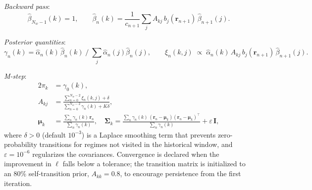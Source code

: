 \documentclass[fleqn,12pt]{report}
\begin{document}
\textit{Backward pass}:
\begin{equation}
    \hat{\beta}_{N_w-1}(k) = 1, \qquad
    \hat{\beta}_n(k) = \frac{1}{c_{n+1}}\sum_j A_{kj}\,b_j(\bm{r}_{n+1})\,\hat{\beta}_{n+1}(j).
\end{equation}

\textit{Posterior quantities}:
\begin{equation}
    \gamma_n(k) = \hat{\alpha}_n(k)\,\hat{\beta}_n(k)\;
                  \Big/\;{\textstyle\sum_j}\hat{\alpha}_n(j)\hat{\beta}_n(j),
    \qquad
    \xi_n(k,j) \;\propto\;
        \hat{\alpha}_n(k)\,A_{kj}\,b_j(\bm{r}_{n+1})\,\hat{\beta}_{n+1}(j).
\end{equation}

\textit{M-step}:
\begin{alignat}{2}
    \pi_k &= \gamma_0(k), \\
    A_{kj} &= \frac{\displaystyle\sum_{n=0}^{N_w-2}\xi_n(k,j) + \delta}
                   {\displaystyle\sum_{n=0}^{N_w-2}\gamma_n(k) + K\delta},
    \label{Eq:HMM_trans}\\
    \bm{\mu}_k &= \frac{\sum_n \gamma_n(k)\,\bm{r}_n}{\sum_n \gamma_n(k)},
    \quad
    \bm{\Sigma}_k = \frac{\sum_n \gamma_n(k)\,(\bm{r}_n-\bm{\mu}_k)(\bm{r}_n-\bm{\mu}_k)^\top}
                         {\sum_n \gamma_n(k)} + \varepsilon\,\bm{I},
\end{alignat}
where $\delta > 0$ (default $10^{-3}$) is a Laplace smoothing term that
prevents zero-probability transitions for regimes not visited in the
historical window, and $\varepsilon = 10^{-6}$ regularizes the covariances.
Convergence is declared when the improvement in $\ell$ falls below a
tolerance; the transition matrix is initialized to an 80\% self-transition
prior, $A_{kk} = 0.8$, to encourage persistence from the first iteration.
\end{document}

